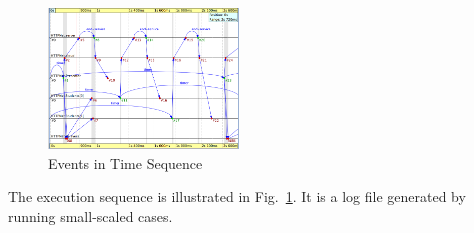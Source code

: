 \begin{figure}[h!]
  \centering
    \includegraphics[width=0.45\textwidth]{figures/r_seq.png}
  \caption{Events in Time Sequence}
  \label{fig:r_seq}
  \vspace{-0.2in}
\end{figure}

The execution sequence is illustrated in Fig.~\ref{fig:r_seq}. It is a log file
generated by running small-scaled cases.



